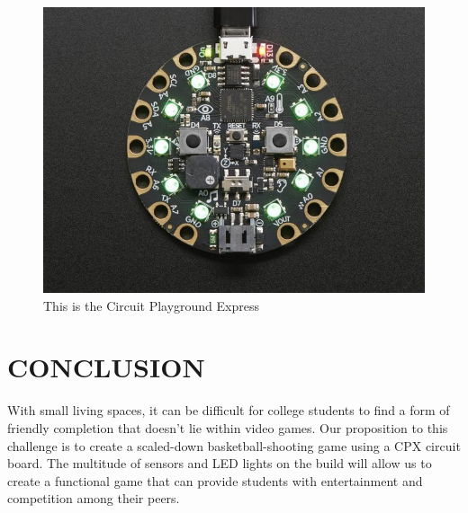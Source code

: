 \documentclass[12pt]{article}
\begin{document}
  \begin{figure}[!t]
\centering
\includegraphics[width=4.5in]{cpx01.jpg}
\caption{This is the Circuit Playground Express}
\label{fig:cpx}
\end{figure}

\newpage
\section{CONCLUSION}
With small living spaces, it can be difficult for college students to find a form of friendly completion that doesn't lie within video games. Our proposition to this challenge is to create a scaled-down basketball-shooting game using a CPX circuit board. The multitude of sensors and LED lights on the build will allow us to create a functional game that can provide students with entertainment and competition among their peers.

\newpage
\printbibliography[heading=subbibintoc]
%
%
\end{document}
